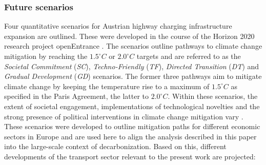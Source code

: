     \subsubsection{Future scenarios}
    Four quantitative scenarios for Austrian highway charging infrastructure expansion are outlined. These were developed in the course of the Horizon 2020 research project openEntrance \citep{openentrance}. The scenarios outline pathways to climate change mitigation by reaching the $1.5^{\circ}C$ or $2.0^{\circ}C$ targets and are referred to as the \textit{Societal Commitment} (\textit{SC}), \textit{Techno-Friendly} (\textit{TF}), \textit{Directed Transition} (\textit{DT}) and \textit{Gradual Development} (\textit{GD}) scenarios. The former three pathways aim to mitigate climate change by keeping the temperature rise to a maximum of $1.5^{\circ}C$ as specified in the Paris Agreement, the latter to $2.0^{\circ}C$. Within these scenarios, the extent of societal engagement, implementations of technological novelties and the strong presence of political interventions in climate change mitigation vary \citep[see also][]{Auer2019, HAINSCH2022122067}. These scenarios were developed to outline mitigation paths for different economic sectors in Europe and are used here to align the analysis described in this paper into the large-scale context of decarbonization. Based on this, different developments of the transport sector relevant to the present work are projected:
